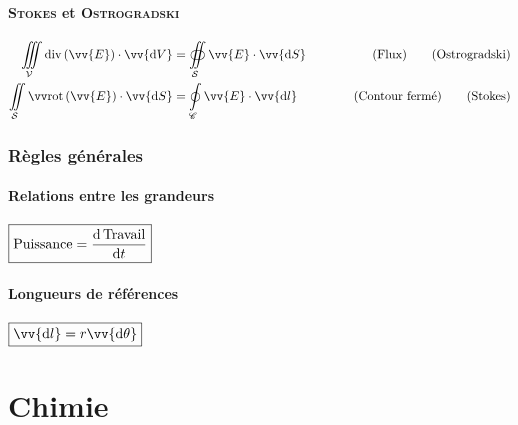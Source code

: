 \documentclass[11pt,a4paper,fleqn,pdftex]{report}
\begin{document}
\subsection{\textsc{Stokes} et \textsc{Ostrogradski}}
\begin{theorem}
\begin{align}
\iiint \limits_\mathcal{V} \diverg[\vv{E}]\cdot \vv{\d{}V} & = \oiint \limits_\mathcal{S}  \vv{E} \cdot\vv{\d{}S}&\hspace{1cm}\text{(Flux)} \index{Ostrogradski}\tag{Ostrogradski}\label{eq:Ostrogradski}\\
\iint \limits_\mathcal{S} \rot[\vv{E}] \cdot\vv{\d{}S} & = \oint \limits_\mathscr{C} \vv{E} \cdot\vv{\d l}&\hspace{1cm}\text{(Contour fermé)} \index{Stokes}\tag{Stokes}\label{eq:Stokes}
\end{align}
\end{theorem}
%
%
\section{Règles générales}
\subsection{Relations entre les grandeurs}
$\boxed{\text{Puissance} = \dfrac{\mathrm{d}\, \text{Travail}}{\mathrm{d} t}}$
\subsection{Longueurs de références}
\begin{minipage}{0.3\linewidth}
$\boxed{\vv{\d l}=r\vv{\d\theta}}$
\end{minipage}\hspace{0.1\linewidth}
\begin{minipage}{0.6\linewidth}
\end{minipage}
%
\part{Chimie} %
\label{prt:chimie}
\end{document}
